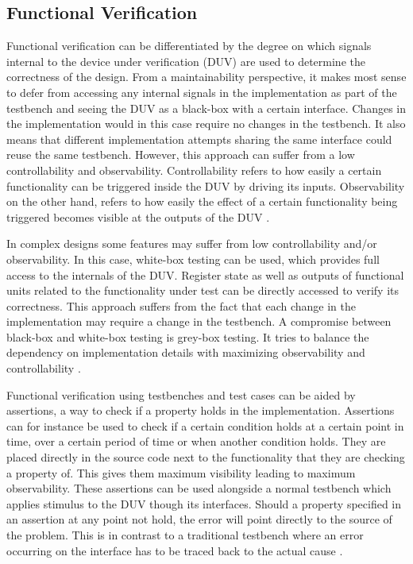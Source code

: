 \documentclass[11pt,a4paper]{report}
\begin{document}
\subsection{Functional Verification} %


Functional verification can be differentiated by the degree on which signals internal to the device under
verification (DUV) are used to determine the correctness of the design. From a maintainability perspective, it makes
most sense to defer from accessing any internal signals in the implementation as part of the testbench and seeing the
DUV as a black-box with a certain interface. Changes in the implementation would in this case require no changes in
the testbench. It also means that different implementation attempts sharing the same interface could reuse the same
testbench. However, this approach can suffer from a low controllability and observability. Controllability refers to
how easily a certain functionality can be triggered inside the DUV by driving its inputs. Observability on the other
hand, refers to how easily the effect of a certain functionality being triggered becomes visible at the outputs of
the DUV \cite[Ch. 1]{bergeron2012writing}.

In complex designs some features may suffer from low controllability and/or observability. In this case, white-box
testing can be used, which provides full access to the internals of the DUV. Register state as well as outputs of
functional units related to the functionality under test can be directly accessed to verify its correctness. This
approach suffers from the fact that each change in the implementation may require a change in the testbench. A
compromise between black-box and white-box testing is grey-box testing. It tries to balance the dependency on
implementation details with maximizing observability and controllability \cite[Ch. 1]{bergeron2012writing}.

Functional verification using testbenches and test cases can be aided by assertions, a way to check if a property
holds in the implementation. Assertions can for instance be used to check if a certain condition holds at a certain
point in time, over a certain period of time or when another condition holds. They are placed directly in the source
code next to the functionality that they are checking a property of. This gives them maximum visibility leading to
maximum observability. These assertions can be used alongside a normal testbench which applies stimulus to the DUV
though its interfaces. Should a property specified in an assertion at any point not hold, the error will point
directly to the source of the problem. This is in contrast to a traditional testbench where an error occurring on the
interface has to be traced back to the actual cause \cite[Ch. 14]{mehta2021introduction}.
\end{document}
